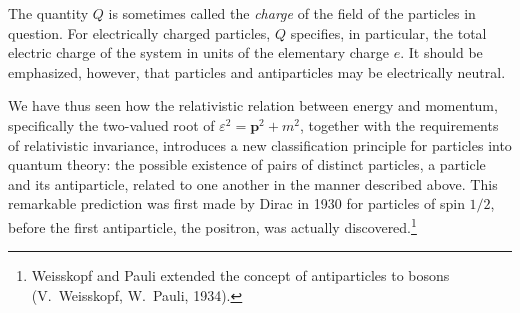 The quantity $Q$ is sometimes called the \emph{charge} of the field of the particles in question. For electrically charged particles, $Q$ specifies, in particular, the total electric charge of the system in units of the elementary charge $e$. It should be emphasized, however, that particles and antiparticles may be electrically neutral.

We have thus seen how the relativistic relation between energy and momentum, specifically the two-valued root of $\varepsilon^2=\mathbf p^2+m^2$, together with the requirements of relativistic invariance, introduces a new classification principle for particles into quantum theory: the possible existence of pairs of distinct particles, a particle and its antiparticle, related to one another in the manner described above. This remarkable prediction was first made by Dirac in 1930 for particles of spin $1/2$, before the first antiparticle, the positron, was actually discovered.\footnote{Weisskopf and Pauli extended the concept of antiparticles to bosons (V.~Weisskopf, W.~Pauli, 1934).}
